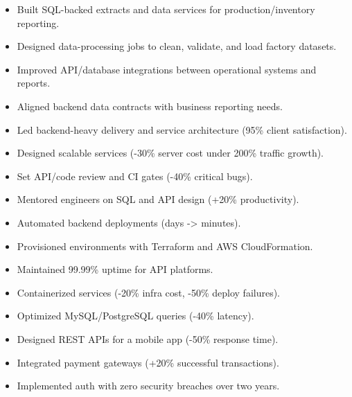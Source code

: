 \begin{itemize}
  \item Built SQL-backed extracts and data services for production/inventory reporting.
  \item Designed data-processing jobs to clean, validate, and load factory datasets.
  \item Improved API/database integrations between operational systems and reports.
  \item Aligned backend data contracts with business reporting needs.
\end{itemize}
\vspace{4pt}
\begin{itemize}
  \item Led backend-heavy delivery and service architecture (95\% client satisfaction).
  \item Designed scalable services (-30\% server cost under 200\% traffic growth).
  \item Set API/code review and CI gates (-40\% critical bugs).
  \item Mentored engineers on SQL and API design (+20\% productivity).
\end{itemize}
\vspace{4pt}
\begin{itemize}
  \item Automated backend deployments (days -> minutes).
  \item Provisioned environments with Terraform and AWS CloudFormation.
  \item Maintained 99.99\% uptime for API platforms.
  \item Containerized services (-20\% infra cost, -50\% deploy failures).
\end{itemize}
\vspace{4pt}
\begin{itemize}
  \item Optimized MySQL/PostgreSQL queries (-40\% latency).
  \item Designed REST APIs for a mobile app (-50\% response time).
  \item Integrated payment gateways (+20\% successful transactions).
  \item Implemented auth with zero security breaches over two years.
\end{itemize}
